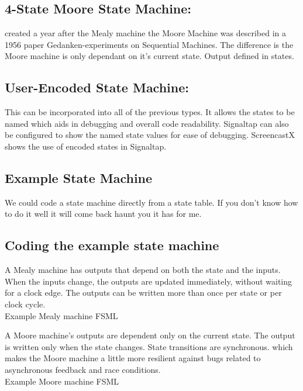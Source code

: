       \subsection{4-State Moore State Machine:} created a year after the Mealy machine the Moore Machine was described in a 1956 paper Gedanken-experiments on Sequential Machines. The difference is the Moore machine is only dependant on it's current state. Output defined in states. \cite{Wikipedia:MooreMachine}

      \subsection{User-Encoded State Machine:} This can be incorporated into all of the previous types. It allows the states to be named which aids in debugging and overall code readability. Signaltap can also be configured to show the named state values for ease of debugging. ScreencastX shows the use of encoded states in Signaltap.

      \subsection{Example State Machine}
      We could code a state machine directly from a state table. If you don't know how to do it well it will come back haunt you it has for me. 

      \clearpage
      \subsection{Coding the example state machine}
      A Mealy machine has outputs that depend on both the state and the inputs.  When the inputs change, the outputs are updated immediately, without waiting for a clock edge.  The outputs can be written more than once per state or per clock cycle.\\
              {Example Mealy machine}
              {FSML}
      \noindent\begin{minipage}{.48\textwidth}
      
      \end{minipage}
      \vfill \hfill
      \newpage
      A Moore machine's outputs are dependent only on the current state. The output is written only when the state changes. State transitions are synchronous. which makes the Moore machine a little more resilient against bugs related to asynchronous feedback and race conditions. \\
               {Example Moore machine}
               {FSML}
      \begin{minipage}{.48\textwidth}
      
      \end{minipage}
      \newpage
      \clearpage

